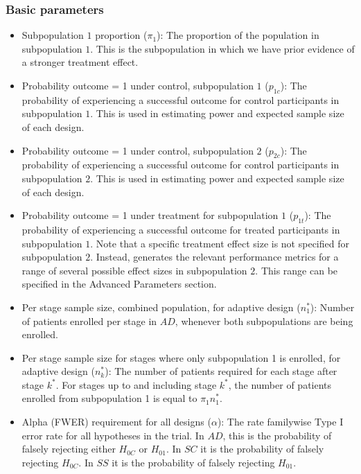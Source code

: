 \documentclass[article]{jss}
\begin{document}
\subsubsection{Basic parameters} %
\label{sub:basic-params}
\begin{itemize} 

\item Subpopulation $1$ proportion ($π_1$): The proportion of the population in subpopulation $1$. This is the subpopulation in which we have prior evidence of a stronger treatment effect. 

\item Probability outcome = 1 under control, subpopulation $1$ ($p_{1c}$): The probability of experiencing a successful outcome for control participants in subpopulation $1$. This is used in estimating power and expected sample size of each design.

\item Probability outcome = 1 under control, subpopulation $2$ ($p_{2c}$): The probability of experiencing a successful outcome for control participants in subpopulation $2$. This is used in estimating power and expected sample size of each design.

\item Probability outcome = 1 under treatment for subpopulation $1$ ($p_{1t}$): The probability of experiencing a successful outcome for treated participants in subpopulation $1$. Note that a specific treatment effect size is not specified for subpopulation $2$. Instead,  generates the relevant performance metrics for a range of several possible effect sizes in subpopulation $2$. This range can be specified in the Advanced Parameters section.

\item Per stage sample size, combined population, for adaptive design ($n_1^*$): Number of patients enrolled per stage in $AD$, whenever both subpopulations are being enrolled.

\item Per stage sample size for stages where only subpopulation 1 is enrolled, for adaptive design ($n_k^*$): The number of patients required for each stage after stage $k^*$. For stages up to and including stage $k^*$, the number of patients enrolled from subpopulation 1 is equal to $\pi_1 n_1^*$.


\item Alpha (FWER) requirement for all designs ($α$): The rate familywise Type I error rate for all hypotheses in the trial. In $AD$, this is the probability of falsely rejecting either $H_{0C}$ or $H_{01}$. In $SC$ it is the probability of falsely rejecting $H_{0C}$. In $SS$ it is the probability of falsely rejecting $H_{01}$.


\end{itemize}
\end{document}
